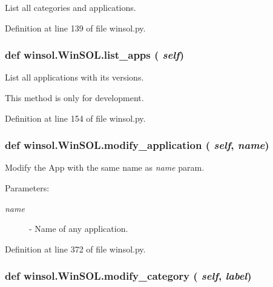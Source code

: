 List all categories and applications. 



Definition at line 139 of file winsol.py.\hypertarget{classwinsol_1_1WinSOL_c71c39f082dae8d131d6825f9cc63ccd}{
\subsubsection[list\_\-apps]{\setlength{\rightskip}{0pt plus 5cm}def winsol.Win\-SOL.list\_\-apps ( {\em self})}}
\label{classwinsol_1_1WinSOL_c71c39f082dae8d131d6825f9cc63ccd}


List all applications with its versions. 

This method is only for development. 

Definition at line 154 of file winsol.py.\hypertarget{classwinsol_1_1WinSOL_bfe4c52dcc7034e403048d9f27cd83c6}{
\subsubsection[modify\_\-application]{\setlength{\rightskip}{0pt plus 5cm}def winsol.Win\-SOL.modify\_\-application ( {\em self},  {\em name})}}
\label{classwinsol_1_1WinSOL_bfe4c52dcc7034e403048d9f27cd83c6}


Modify the App with the same name as {\em name\/} param. 

\begin{Desc}
\item[Parameters:]
\begin{description}
\item[{\em name}]- Name of any application. \end{description}
\end{Desc}


Definition at line 372 of file winsol.py.\hypertarget{classwinsol_1_1WinSOL_a8a75759c68ca83bf3480a4892294c5a}{
\subsubsection[modify\_\-category]{\setlength{\rightskip}{0pt plus 5cm}def winsol.Win\-SOL.modify\_\-category ( {\em self},  {\em label})}}
\label{classwinsol_1_1WinSOL_a8a75759c68ca83bf3480a4892294c5a}


